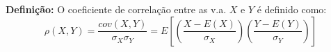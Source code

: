 \documentclass[14pt,aspectratio=1610]{beamer}
\begin{document}
\begin{frame}{}
\frametitle{}
\begin{block}{}
\justifying
\textbf{Definição:} O coeficiente de correlação entre as v.a. $X$ e $Y$ é definido como: 
$$\rho(X,Y)=\dfrac{cov(X,Y)}{\sigma_{X}\sigma_{Y}}=E\left[\left(\dfrac{X-E(X)}{\sigma_{X}}\right)\left(\dfrac{Y-E(Y)}{\sigma_{Y}}\right)\right]$$
\end{block}
\nocite{roteiro}
\end{frame}

% 
% 
% 
% 
% 
% 
% 
% 
% 
% 
% 
% 
% 
% 
% 
% 
% 
% 
% 
% 
% 
% 
% 
% 
\end{document}
